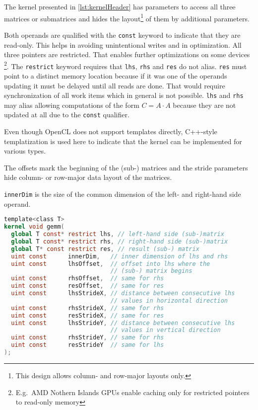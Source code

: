 The kernel presented in \cref{lst:kernelHeader} has parameters to access all 
three matrices or submatrices and hides the layout\footnote{This design allows 
column- and row-major layouts only.} of them by additional parameters.

Both operands are qualified with the \texttt{const} keyword to indicate that 
they are read-only. This helps in avoiding unintentional writes and in
optimization. All three pointers are restricted. That enables further 
optimizations on some devices \footnote{E.g.\ AMD Nothern Islands \acp{GPU} 
enable caching only for restricted pointers to read-only 
memory\cite[Section 7.4]{AMD2013}}. The \texttt{restrict} keyword requires that 
\texttt{lhs}, \texttt{rhs} and \texttt{res} do not alias. \texttt{res} must 
point to a distinct memory location because if it was one of the operands 
updating it must be delayed until all reads are done. That would require 
synchronization of all work items which in general is not possible. 
\texttt{lhs} and \texttt{rhs} may alias allowing computations of the form $C = 
A \cdot A$ because they are not updated at all due to the \texttt{const} 
qualifier.

Even though OpenCL does not support templates directly, C++-style 
templatization is used here to indicate that the kernel can be implemented for 
various types.

The offsets mark the beginning of the (sub-) matrices and the stride parameters 
hide column- or row-major data layout of the matrices.

\texttt{innerDim} is the size of the common dimension of the left- and 
right-hand side operand.
\begin{lstlisting}[caption={Interface of the OpenCL kernel for matrix-matrix 
multiplication},label={lst:kernelHeader},language=OpenCL]
template<class T>
kernel void gemm(
  global T const* restrict lhs, // left-hand side (sub-)matrix
  global T const* restrict rhs, // right-hand side (sub-)matrix
  global T* const restrict res, // result (sub-) matrix
  uint const      innerDim,   // inner dimension of lhs and rhs
  uint const      lhsOffset,  // offset into lhs where the 
                              // (sub-) matrix begins
  uint const      rhsOffset,  // same for rhs
  uint const      resOffset,  // same for res
  uint const      lhsStrideX, // distance between consecutive lhs
                              // values in horizontal direction
  uint const      rhsStrideX, // same for rhs
  uint const      resStrideX, // same for res
  uint const      lhsStrideY, // distance between consecutive lhs
                              // values in vertical direction
  uint const      rhsStrideY, // same for rhs
  uint const      resStrideY  // same for lhs
);\end{lstlisting}

